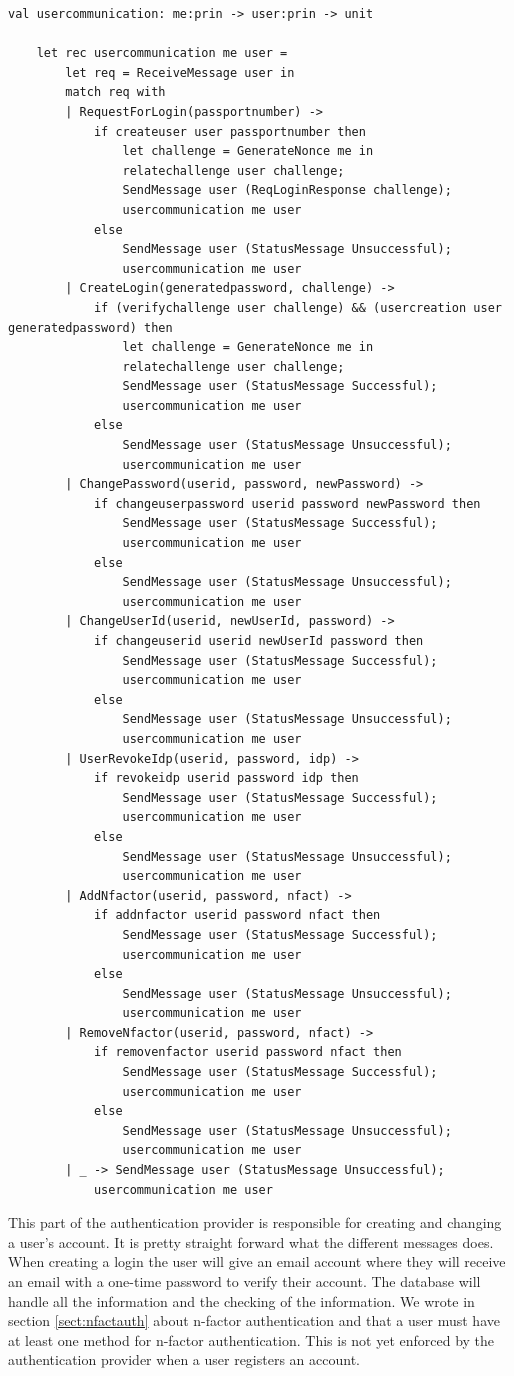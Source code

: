\documentclass[twosided]{report}
\begin{document}
\begin{lstlisting}[style=fstar, caption={The creation and changing of a user's account}]
	val usercommunication: me:prin -> user:prin -> unit

	let rec usercommunication me user =
		let req = ReceiveMessage user in
		match req with
		| RequestForLogin(passportnumber) -> 
			if createuser user passportnumber then
				let challenge = GenerateNonce me in
				relatechallenge user challenge;
				SendMessage user (ReqLoginResponse challenge);
				usercommunication me user
			else
				SendMessage user (StatusMessage Unsuccessful);
				usercommunication me user
		| CreateLogin(generatedpassword, challenge) ->
			if (verifychallenge user challenge) && (usercreation user generatedpassword) then
				let challenge = GenerateNonce me in
				relatechallenge user challenge;
				SendMessage user (StatusMessage Successful);
				usercommunication me user
			else
				SendMessage user (StatusMessage Unsuccessful);
				usercommunication me user
		| ChangePassword(userid, password, newPassword) ->
			if changeuserpassword userid password newPassword then
				SendMessage user (StatusMessage Successful);
				usercommunication me user
			else
				SendMessage user (StatusMessage Unsuccessful);
				usercommunication me user
		| ChangeUserId(userid, newUserId, password) ->
			if changeuserid userid newUserId password then
				SendMessage user (StatusMessage Successful);
				usercommunication me user
			else
				SendMessage user (StatusMessage Unsuccessful);
				usercommunication me user
		| UserRevokeIdp(userid, password, idp) ->
			if revokeidp userid password idp then
				SendMessage user (StatusMessage Successful);
				usercommunication me user
			else
				SendMessage user (StatusMessage Unsuccessful);
				usercommunication me user
		| AddNfactor(userid, password, nfact) ->
			if addnfactor userid password nfact then
				SendMessage user (StatusMessage Successful);
				usercommunication me user
			else
				SendMessage user (StatusMessage Unsuccessful);
				usercommunication me user
		| RemoveNfactor(userid, password, nfact) ->
			if removenfactor userid password nfact then
				SendMessage user (StatusMessage Successful);
				usercommunication me user
			else
				SendMessage user (StatusMessage Unsuccessful);
				usercommunication me user
		| _ -> SendMessage user (StatusMessage Unsuccessful);
			usercommunication me user
\end{lstlisting}

This part of the authentication provider is responsible for creating and changing a user's account. It is pretty straight forward what the different messages does. When creating a login the user will give an email account where they will receive an email with a one-time password to verify their account. The database will handle all the information and the checking of the information. We wrote in section \ref{sect:nfactauth} about n-factor authentication and that a user must have at least one method for n-factor authentication. This is not yet enforced by the authentication provider when a user registers an account.
\end{document}
